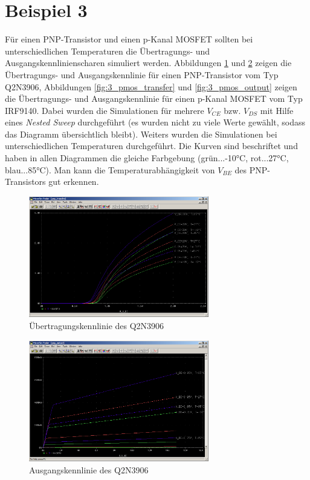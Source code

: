 \section{Beispiel 3}

Für einen PNP-Transistor und einen p-Kanal MOSFET sollten bei unterschiedlichen Temperaturen die Übertragungs- und Ausgangskennlinienscharen simuliert werden. Abbildungen \ref{fig:3_pnp_transfer} und \ref{fig:3_pnp_output} zeigen die Übertragungs- und Ausgangskennlinie für einen PNP-Transistor vom Typ Q2N3906, Abbildungen \ref{fig:3_pmos_transfer} und \ref{fig:3_pmos_output} zeigen die Übertragungs- und Ausgangskennlinie für einen p-Kanal MOSFET vom Typ IRF9140. Dabei wurden die Simulationen für mehrere $V_{CE}$ bzw. $V_{DS}$ mit Hilfe eines \emph{Nested Sweep} durchgeführt (es wurden nicht zu viele Werte gewählt, sodass das Diagramm übersichtlich bleibt). Weiters wurden die Simulationen bei unterschiedlichen Temperaturen durchgeführt. Die Kurven sind beschriftet und haben in allen Diagrammen die gleiche Farbgebung (grün...-10°C, rot...27°C, blau...85°C). Man kann die Temperaturabhängigkeit von $V_{BE}$ des PNP-Transistors gut erkennen.

\begin{figure}[h!]
	\centering
	\includegraphics[width=0.70\textwidth]{fig/ue2_ex3_pnp_transfer.PNG}
	\caption{Übertragungskennlinie des Q2N3906}
	\label{fig:3_pnp_transfer}
\end{figure}

\begin{figure}[h!]
	\centering
	\includegraphics[width=0.70\textwidth]{fig/ue2_ex3_pnp_output.PNG}
	\caption{Ausgangskennlinie des Q2N3906}
	\label{fig:3_pnp_output}
\end{figure}

